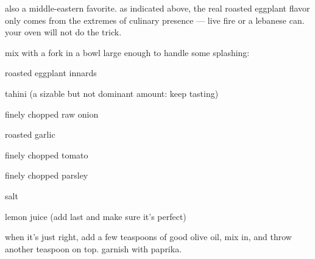 also a middle-eastern favorite. as indicated above, the real roasted eggplant 
flavor only comes from the extremes of culinary presence --- live fire or a 
lebanese can. your oven will not do the trick.

mix with a fork in a bowl large enough to handle some splashing:

\begin{ingredients}
  \item roasted eggplant innards
  \item tahini (a sizable but not dominant amount: keep tasting)
  \item finely chopped raw onion
  \item roasted garlic
  \item finely chopped tomato
  \item finely chopped parsley
  \item salt
  \item lemon juice (add last and make sure it's perfect)
\end{ingredients}

when it's just right, add a few teaspoons of good olive oil, mix in, and throw 
another teaspoon on top. garnish with paprika.
